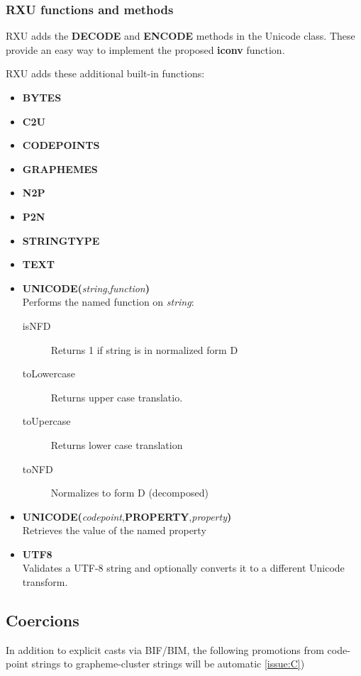 \documentclass[b4paper]{article}
\begin{document}
\subsubsection{RXU functions and methods}

RXU adds the \textbf{DECODE} and \textbf{ENCODE} methods in the Unicode class. These provide an easy way to implement the proposed \textbf{iconv} function.

RXU adds these\cite{RXU:NewBIFs} additional built-in functions:

\begin{itemize}
\item \textbf{BYTES}
\item \textbf{C2U}
\item \textbf{CODEPOINTS}
\item \textbf{GRAPHEMES}
\item \textbf{N2P}
\item \textbf{P2N}
\item \textbf{STRINGTYPE}
\item \textbf{TEXT}
\item \textbf{UNICODE(}\textit{string},\textit{function}\textbf{)} \\
Performs the named function on \textit{string}:
\begin{description}
\item[isNFD] Returns 1 if string is in normalized form D
\item[toLowercase]
Returns upper case translatio.
\item[toUpercase]
Returns lower case translation
\item[toNFD] Normalizes to form D (decomposed)
\end{description}
\item \textbf{UNICODE(}\textit{codepoint},\textbf{PROPERTY},\textit{property}\textbf{)} \\
Retrieves the value of the named property
\item \textbf{UTF8} \\
Validates a UTF-8 string and optionally converts it to a different Unicode transform.
\end{itemize}

\subsection{Coercions}
In addition to explicit casts via BIF/BIM, the following promotions
from code-point strings to grapheme-cluster strings will be automatic
\cref{issue:C})
\end{document}
